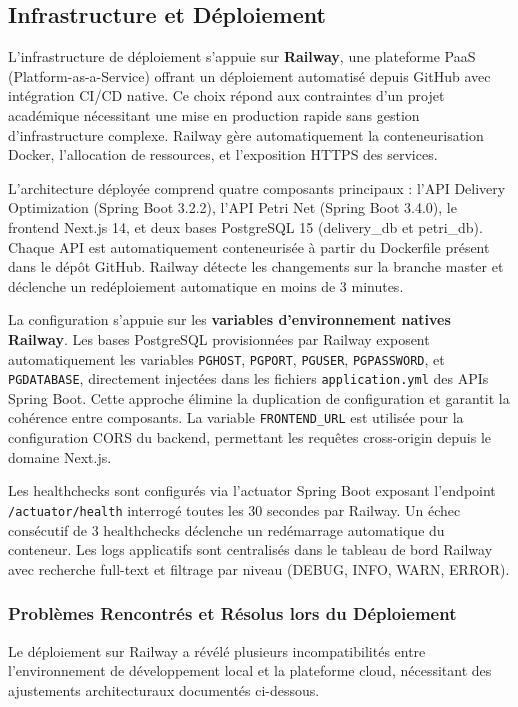 \subsection{Infrastructure et Déploiement}

L'infrastructure de déploiement s'appuie sur \textbf{Railway}, une plateforme PaaS (Platform-as-a-Service) offrant un déploiement automatisé depuis GitHub avec intégration CI/CD native. Ce choix répond aux contraintes d'un projet académique nécessitant une mise en production rapide sans gestion d'infrastructure complexe. Railway gère automatiquement la conteneurisation Docker, l'allocation de ressources, et l'exposition HTTPS des services.

L'architecture déployée comprend quatre composants principaux : l'API Delivery Optimization (Spring Boot 3.2.2), l'API Petri Net (Spring Boot 3.4.0), le frontend Next.js 14, et deux bases PostgreSQL 15 (delivery\_db et petri\_db). Chaque API est automatiquement conteneurisée à partir du Dockerfile présent dans le dépôt GitHub. Railway détecte les changements sur la branche master et déclenche un redéploiement automatique en moins de 3 minutes.

La configuration s'appuie sur les \textbf{variables d'environnement natives Railway}. Les bases PostgreSQL provisionnées par Railway exposent automatiquement les variables \texttt{PGHOST}, \texttt{PGPORT}, \texttt{PGUSER}, \texttt{PGPASSWORD}, et \texttt{PGDATABASE}, directement injectées dans les fichiers \texttt{application.yml} des APIs Spring Boot. Cette approche élimine la duplication de configuration et garantit la cohérence entre composants. La variable \texttt{FRONTEND\_URL} est utilisée pour la configuration CORS du backend, permettant les requêtes cross-origin depuis le domaine Next.js.

Les healthchecks sont configurés via l'actuator Spring Boot exposant l'endpoint \texttt{/actuator/health} interrogé toutes les 30 secondes par Railway. Un échec consécutif de 3 healthchecks déclenche un redémarrage automatique du conteneur. Les logs applicatifs sont centralisés dans le tableau de bord Railway avec recherche full-text et filtrage par niveau (DEBUG, INFO, WARN, ERROR).

\subsubsection{Problèmes Rencontrés et Résolus lors du Déploiement}

Le déploiement sur Railway a révélé plusieurs incompatibilités entre l'environnement de développement local et la plateforme cloud, nécessitant des ajustements architecturaux documentés ci-dessous.

